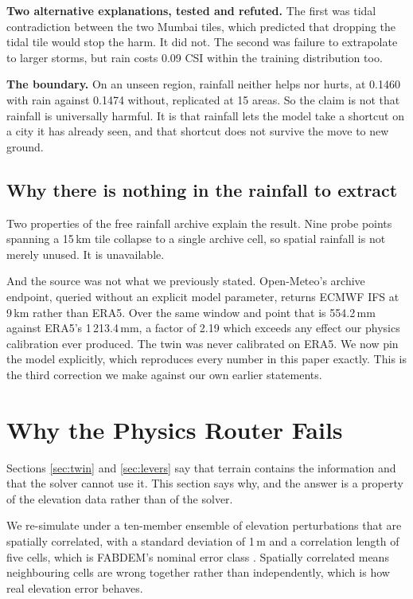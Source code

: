 \textbf{Two alternative explanations, tested and refuted.} The first was tidal contradiction
between the two Mumbai tiles, which predicted that dropping the tidal tile would stop the harm. It
did not. The second was failure to extrapolate to larger storms, but rain costs 0.09 CSI within the
training distribution too.

\textbf{The boundary.} On an unseen region, rainfall neither helps nor hurts, at 0.1460 with rain
against 0.1474 without, replicated at 15 areas. So the claim is not that rainfall is universally
harmful. It is that rainfall lets the model take a shortcut on a city it has already seen, and that
shortcut does not survive the move to new ground.

\subsection{Why there is nothing in the rainfall to extract}
Two properties of the free rainfall archive explain the result. Nine probe points spanning a 15\,km
tile collapse to a single archive cell, so spatial rainfall is not merely unused. It is
unavailable.

And the source was not what we previously stated. Open-Meteo's archive endpoint, queried without an
explicit model parameter, returns ECMWF IFS at 9\,km rather than ERA5. Over the same window and
point that is 554.2\,mm against ERA5's 1\,213.4\,mm, a factor of 2.19 which exceeds any effect our
physics calibration ever produced. The twin was never calibrated on ERA5. We now pin the model
explicitly, which reproduces every number in this paper exactly. This is the third correction we
make against our own earlier statements.

\section{Why the Physics Router Fails}
\label{sec:dem}

Sections \ref{sec:twin} and \ref{sec:levers} say that terrain contains the information and that the
solver cannot use it. This section says why, and the answer is a property of the elevation data
rather than of the solver.

We re-simulate under a ten-member ensemble of elevation perturbations that are spatially
correlated, with a standard deviation of 1\,m and a correlation length of five cells, which is
FABDEM's nominal error class \cite{marsh2024}. Spatially correlated means neighbouring cells are
wrong together rather than independently, which is how real elevation error behaves.

